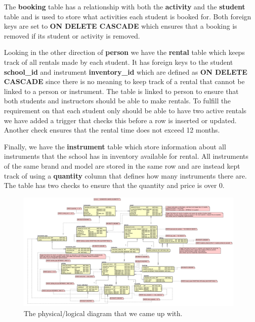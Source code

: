 \documentclass[a4paper]{scrartcl}
\begin{document}
The \textbf{booking} table has a relationship with both the \textbf{activity} and the \textbf{student} table and is used to store what activities each student is booked for. Both foreign keys are set to \textbf{ON DELETE CASCADE} which ensures that a booking is removed if its student or activity is removed.

Looking in the other direction of \textbf{person} we have the \textbf{rental} table which keeps track of all rentals made by each student. It has foreign keys to the student \textbf{school\_id} and instrument \textbf{inventory\_id} which are defined as \textbf{ON DELETE CASCADE} since there is no meaning to keep track of a rental that cannot be linked to a person or instrument. The table is linked to person to ensure that both students and instructors should be able to make rentals. To fulfill the requirement on that each student only should be able to have two active rentals we have added a trigger that checks this before a row is inserted or updated. Another check ensures that the rental time does not exceed 12 months.

Finally, we have the \textbf{instrument} table which store information about all instruments that the school has in inventory available for rental. All instruments of the same brand and model are stored in the same row and are instead kept track of using a \textbf{quantity} column that defines how many instruments there are. The table has two checks to ensure that the quantity and price is over 0.

\begin{figure}[H]
  \begin{center}
    \includegraphics[scale=0.18]{Diagram Picture.png}
    \caption{The physical/logical diagram that we came up with.}
    \label{fig:diag}
  \end{center}
\end{figure}
\end{document}
